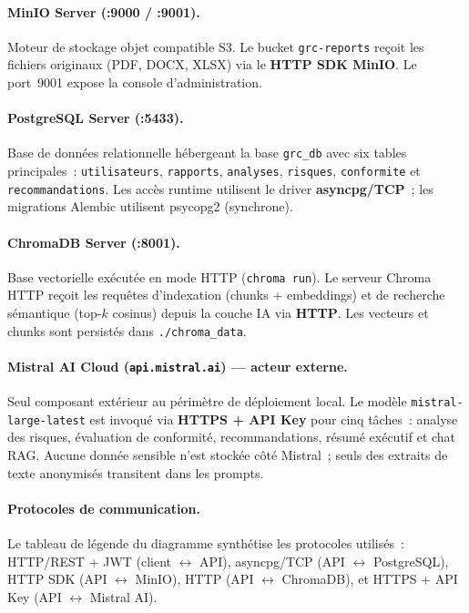 \documentclass[a4paper,12pt,oneside]{report}
\begin{document}
	\paragraph{MinIO Server (:9000 / :9001).}
	Moteur de stockage objet compatible S3.
	Le bucket \texttt{grc-reports} re\c{c}oit les fichiers originaux
	(PDF, DOCX, XLSX) via le \textbf{HTTP SDK MinIO}.
	Le port~9001 expose la console d'administration.
	
	\paragraph{PostgreSQL Server (:5433).}
	Base de donn\'ees relationnelle h\'ebergeant la base \texttt{grc\_db}
	avec six tables principales~: \texttt{utilisateurs}, \texttt{rapports},
	\texttt{analyses}, \texttt{risques}, \texttt{conformite} et \texttt{recommandations}.
	Les acc\`es runtime utilisent le driver \textbf{asyncpg/TCP}~;
	les migrations Alembic utilisent psycopg2 (synchrone).
	
	\paragraph{ChromaDB Server (:8001).}
	Base vectorielle ex\'ecut\'ee en mode HTTP (\texttt{chroma run}).
	Le serveur Chroma HTTP re\c{c}oit les requ\^etes d'indexation
	(chunks + embeddings) et de recherche s\'emantique (top-$k$ cosinus)
	depuis la couche IA via \textbf{HTTP}.
	Les vecteurs et chunks sont persist\'es dans \texttt{./chroma\_data}.
	
	\paragraph{Mistral AI Cloud (\texttt{api.mistral.ai}) --- acteur externe.}
	Seul composant ext\'erieur au p\'erim\`etre de d\'eploiement local.
	Le mod\`ele \texttt{mistral-large-latest} est invoqu\'e via \textbf{HTTPS + API Key}
	pour cinq t\^aches~: analyse des risques, \'evaluation de conformit\'e,
	recommandations, r\'esum\'e ex\'ecutif et chat RAG.
	Aucune donn\'ee sensible n'est stock\'ee c\^ot\'e Mistral~;
	seuls des extraits de texte anonymis\'es transitent dans les prompts.
	
	\paragraph{Protocoles de communication.}
	Le tableau de l\'egende du diagramme synth\'etise les protocoles utilis\'es~:
	HTTP/REST + JWT (client $\leftrightarrow$ API), asyncpg/TCP (API $\leftrightarrow$ PostgreSQL),
	HTTP SDK (API $\leftrightarrow$ MinIO), HTTP (API $\leftrightarrow$ ChromaDB),
	et HTTPS + API Key (API $\leftrightarrow$ Mistral AI).
	
\end{document}
